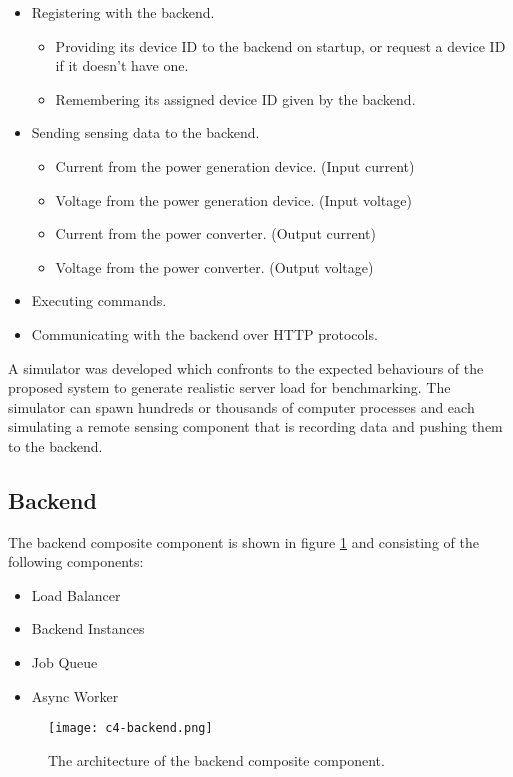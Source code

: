 \documentclass[../thesis.tex]{subfiles}
\begin{document}
\begin{itemize}
\item Registering with the backend.
\begin{itemize}
\item Providing its device ID to the backend on startup, or request a device ID if it doesn't have one.
\item Remembering its assigned device ID given by the backend.
\end{itemize}
\item Sending sensing data to the backend.
\begin{itemize}
\item Current from the power generation device. (Input current)
\item Voltage from the power generation device. (Input voltage)
\item Current from the power converter. (Output current)
\item Voltage from the power converter. (Output voltage)
\end{itemize}
\item Executing commands.
\item Communicating with the backend over HTTP protocols.
\end{itemize}

A simulator was developed which confronts to the expected behaviours of the proposed system to generate realistic server load for benchmarking. The simulator can spawn hundreds or thousands of computer processes and each simulating a remote sensing component that is recording data and pushing them to the backend.


\subsection{Backend}
\label{sec:backend}

The backend composite component is shown in figure \ref{fig:backend} and consisting of the following components:
\begin{itemize}
\item Load Balancer
\item Backend Instances
\item Job Queue
\item Async Worker
\end{itemize}


\begin{figure}[!ht]
\centering
\texttt{[image: c4-backend.png]}
\caption{The architecture of the backend composite component.}
\label{fig:backend}
\end{figure}
\end{document}
